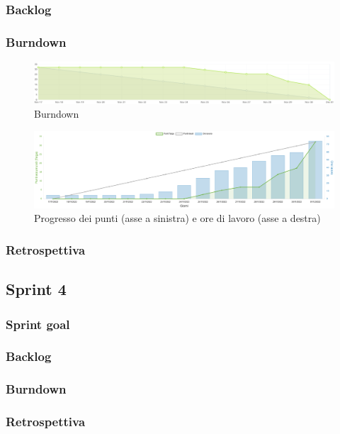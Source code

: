 \documentclass[11pt]{article}
\begin{document}
\subsubsection{Backlog}

\subsubsection{Burndown}
\begin{figure}[H]
    \centering
    \includegraphics[width=12cm]{./img/sprint3/burndown.png}
    \caption{Burndown}
\end{figure}
\begin{figure}[H]
    \centering
    \includegraphics[width=12cm]{./img/sprint3/worktime.png}
    \caption{Progresso dei punti (asse a sinistra) e ore di lavoro (asse a destra)}
\end{figure}

\subsubsection{Retrospettiva}


\subsection{Sprint 4}
\subsubsection{Sprint goal}
\subsubsection{Backlog}
\subsubsection{Burndown}
\subsubsection{Retrospettiva}
\end{document}
